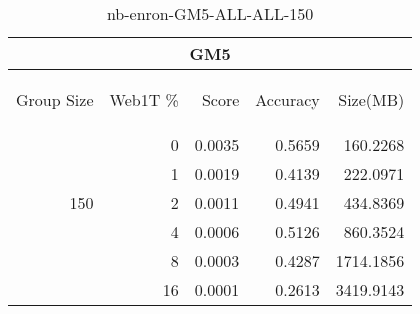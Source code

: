 \begin{center}
\begin{table}[htbp] 
 \begin{center}
\begin{tabular}{ | r | r | r | r | r |}
\hline
\multicolumn{5}{|c|}{GM5}\\
\hline
\begin{sideways}Group Size\end{sideways} & \begin{sideways}Web1T \%\end{sideways} & \begin{sideways}Score\end{sideways} & \begin{sideways}Accuracy\end{sideways} & \begin{sideways}Size(MB)\end{sideways}\\
\hline
\multirow{5}{*}{150}
 & 0 & 0.0035 & 0.5659 & 160.2268\\ \cline{2-5}
 & 1 & 0.0019 & 0.4139 & 222.0971\\ \cline{2-5}
 & 2 & 0.0011 & 0.4941 & 434.8369\\ \cline{2-5}
 & 4 & 0.0006 & 0.5126 & 860.3524\\ \cline{2-5}
 & 8 & 0.0003 & 0.4287 & 1714.1856\\ \cline{2-5}
 & 16 & 0.0001 & 0.2613 & 3419.9143\\ \cline{2-5}
\hline
\end{tabular}
\caption{nb-enron-GM5-ALL-ALL-150}
\label{table:nb-enron-GM5-ALL-ALL-150}
\end{center}
 \end{table}
\end{center}

